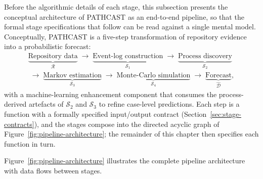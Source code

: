 Before the algorithmic details of each stage, this subsection presents the
conceptual architecture of PATHCAST as an end-to-end pipeline, so that the
formal stage specifications that follow can be read against a single mental
model. Conceptually, PATHCAST is a five-step transformation of repository
evidence into a probabilistic forecast:
\[
\begin{split}
\underbrace{\text{Repository data}}_{\mathcal{R}}
\;\to\; \underbrace{\text{Event-log construction}}_{\mathcal{S}_1}
\;\to\; \underbrace{\text{Process discovery}}_{\mathcal{S}_2}
\\
\;\to\; \underbrace{\text{Markov estimation}}_{\mathcal{S}_3}
\;\to\; \underbrace{\text{Monte-Carlo simulation}}_{\mathcal{S}_4}
\;\to\; \underbrace{\text{Forecast}}_{\hat{\mathcal{D}}},
\end{split}
\]
with a machine-learning enhancement component that consumes the
process-derived artefacts of $\mathcal{S}_2$ and $\mathcal{S}_3$ to refine
case-level predictions. Each step is a function with a formally specified
input/output contract (Section~\ref{sec:stage-contracts}), and the stages
compose into the directed acyclic graph of
Figure~\ref{fig:pipeline-architecture}; the remainder of this chapter then
specifies each function in turn.

Figure~\ref{fig:pipeline-architecture} illustrates the complete pipeline
architecture with data flows between stages.

